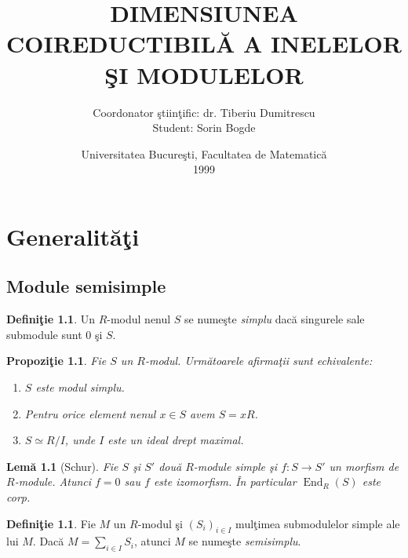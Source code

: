 \documentclass[12pt,a4paper]{book}
\title{DIMENSIUNEA COIREDUCTIBILĂ A INELELOR ŞI MODULELOR}
\author{Coordonator ştiinţific: dr. Tiberiu Dumitrescu\\[0.5em]
Student: Sorin Bogde}
\date{Universitatea Bucureşti, Facultatea de Matematică\\[0.5em] 1999}
\DeclareMathOperator{\End}{End}
\theoremstyle{plain}
\newtheorem{lemma}[theorem]{Lemă}
\newtheorem{proposition}[theorem]{Propoziţie}
\theoremstyle{definition}
\newtheorem{definition}[theorem]{Definiţie}
\theoremstyle{remark}
\begin{document}
\frontmatter
\maketitle
\tableofcontents


\mainmatter

\setcounter{chapter}{-1}
\chapter{Generalităţi}

\section{Module semisimple}

\begin{definition}
Un \(R\)-modul nenul \(S\) se numeşte \emph{simplu} dacă singurele sale submodule sunt
\(0\) şi \(S\).
\end{definition}

\begin{proposition}
Fie \(S\) un \(R\)-modul. Următoarele afirmaţii sunt echivalente:
\begin{enumerate}
  \item \(S\) este modul simplu.
  \item Pentru orice element nenul \(x\in S\) avem \(S = xR\).
  \item \(S \simeq R/I\), unde \(I\) este un ideal drept maximal.
\end{enumerate}
\end{proposition}

\begin{lemma}[Schur]
Fie \(S\) şi \(S'\) două \(R\)-module simple şi \(f\colon S \to S'\) un morfism de \(R\)-module.
Atunci \(f = 0\) sau \(f\) este izomorfism. În particular \(\End_R(S)\) este corp.
\end{lemma}

\begin{definition}
Fie \(M\) un \(R\)-modul şi \((S_i)_{i\in I}\) mulţimea submodulelor simple ale lui \(M\).
Dacă \(M = \sum_{i\in I} S_i\), atunci \(M\) se numeşte \emph{semisimplu}.
\end{definition}
\end{document}
